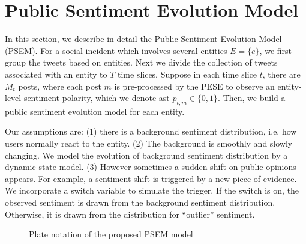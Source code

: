\documentclass[runningheads]{llncs}
\begin{document}
\section{Public Sentiment Evolution Model}\label{sec:public opinion model}

In this section, we describe in detail the Public Sentiment Evolution Model (PSEM). 
For a social incident which involves several entities $E=\{e\}$, we first group the tweets based on entities. 
Next we divide the collection of tweets associated with an entity to $T$ time slices. 
Suppose in each time slice $t$, there are $M_t$ posts, where each post $m$ is pre-processed by the PESE to observe an entity-level sentiment polarity, which we denote ast $p_{t,m}\in \{0,1\}$. 
Then, we build a public sentiment evolution model for each entity.

Our assumptions are: (1) there is a background sentiment distribution, i.e. how users normally react to the entity. 
(2) The background is smoothly and slowly changing. We model the evolution of background sentiment distribution by a dynamic state model.
(3) However sometimes a sudden shift on public opinions appears. For example, a sentiment shift is triggered by a new piece of evidence. We incorporate a switch variable to simulate the trigger. If the switch is on, the observed sentiment is drawn from the background sentiment distribution. Otherwise, it is drawn from the distribution for ``outlier'' sentiment.

\begin{figure}[htp]
  \centering
 \caption{Plate notation of the proposed PSEM model}\label{fig:opinion}
\end{figure}
\end{document}
